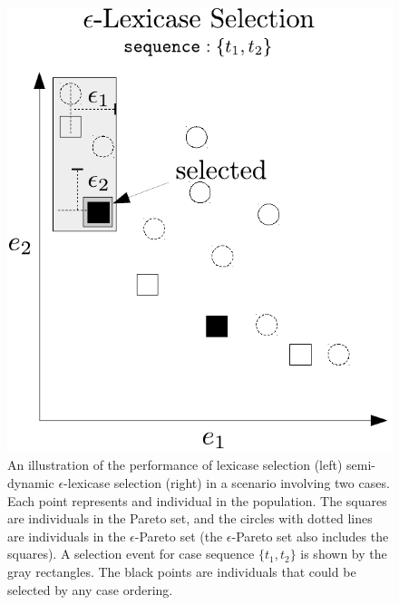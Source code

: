 \documentclass[twoside]{article}
\begin{document}
\begin{figure}[htb]
\begin{minipage}{0.49\textwidth}
\end{minipage}
\hspace{0.02\textwidth}
\begin{minipage}{0.49\textwidth}
\centering
  \includegraphics[width = \textwidth]{figs/ep-lex_pareto.pdf}
  
\end{minipage}
\caption{An illustration of the performance of lexicase selection (left) semi-dynamic $\epsilon$-lexicase selection (right) in a scenario involving two cases. Each point represents and individual in the population. The squares are individuals in the Pareto set, and the circles with dotted lines are individuals in the $\epsilon$-Pareto set (the $\epsilon$-Pareto set also includes the squares). A selection event for case sequence $\{t_1,t_2\}$ is shown by the gray rectangles. The black points are individuals that could be selected by any case ordering.}\label{fig:lex_pareto}
\end{figure}
\end{document}
